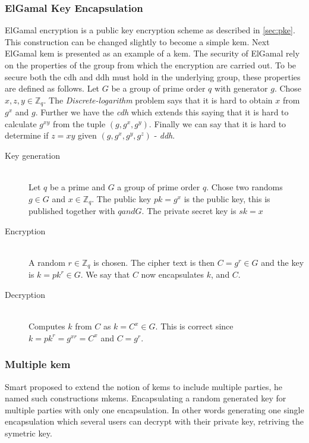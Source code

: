 \subsubsection{ElGamal Key Encapsulation }\label{subsubsec:elgamal}
ElGamal encryption is a public key encryption scheme as described in \ref{sec:pke}. This construction can be changed slightly to become a simple \gls{kem}. Next ElGamal \gls{kem} \cite{elgamal-kem} is presented as an example of a \gls{kem}. The security of ElGamal rely on the properties of the group from which the encryption are carried out. To be secure both the \gls{cdh} and \gls{ddh} must hold in the underlying group, these properties are defined as follows. Let $G$ be a group of prime order $q$ with generator $g$. Chose $x,z,y \in \mathbb{Z}_q$. The \emph{Discrete-logarithm} problem says that it is hard to obtain $x$ from $g^x$ and $g$. Further we have the \emph{\gls{cdh}} which extends this saying that it is hard to calculate $g^{xy}$ from the tuple $(g, g^x, g^y)$. Finally we can say that it is hard to determine if $z=xy$ given $(g, g^x, g^y, g^z)$ - \emph{\gls{ddh}}. 
\begin{description}
\item[Key generation]\hfill \\
Let $q$ be a prime and $G$ a group of prime order $q$. Chose two randoms $g \in G$ and $x \in \mathbb{Z}_q$. The public key $pk = g^x$ is the public key, this is published together with $q and G$. The private secret key is $sk = x$ 
\item[Encryption]\hfill \\
A random $r \in \mathbb{Z}_q$ is chosen. The cipher text is then $C = g^r \in G$ and the key is $k = pk^r \in G$. We say that $C$ now encapsulates $k$, and $C$.
\item[Decryption]\hfill \\
Computes $k$ from $C$ as $k = C^x \in G$. This is correct since \\$k = pk^r = g^{xr} = C^x$ and $ C = g^r$.
\end{description}




\subsubsection{Multiple \gls{kem}}\label{mkem}
Smart \cite{mkem} proposed to extend the notion of \glspl{kem} to include multiple parties, he named such constructions m\Glspl{kem}. Encapsulating a random generated key for multiple parties with only one encapsulation. In other words generating one single encapsulation which several users can decrypt with their private key, retriving the symetric key.




